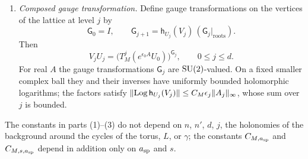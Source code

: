 \begin{lemma}
\begin{enumerate}
\[\]
The coordinate $(A_j)_c$ depends only on the variables $A_e$ with $\dist(c,e)\le C_M\epsilon_j$, where distances are measured in the units above, in which the coarse spacing is one. For every fixed $\asp\ge0$ we have $\norm{D_AA_j}_{\asp,\mathrm{row}}\le C_{M,\asp}$ on the same ball. For every fixed $s\ge1$, on the ball $\norm A_\infty<a_*/2$, every coarse link $c$ and all link fields $B_1,\ldots,B_s$,
\[
 \bigl\lvert\bigl(D_A^sA_j(A)[B_1,\ldots,B_s]\bigr)_c\bigr\rvert\le C_{M,s,\asp}\prod_{\ell=1}^s\sup_ee^{-\asp\dist(c,e)}\abs{(B_\ell)_e}.
\]
\item \emph{Composed gauge transformation.} Define gauge transformations on the vertices of the lattice at level $j$ by
\[
 \mathsf G_0=I,\qquad\mathsf G_{j+1}=\mathsf h_{U_j}(V_j)\,(\mathsf G_j|_{\mathrm{roots}}).
\]
Then
\[
 V_jU_j=\bigl(T_M^j(e^{\epsilon_0A}U_0)\bigr)^{\mathsf G_j},\qquad0\le j\le d.
\]
For real $A$ the gauge transformations $\mathsf G_j$ are $\mathrm{SU}(2)$-valued. On a fixed smaller complex ball they and their inverses have uniformly bounded holomorphic logarithms; the factors satisfy $\lVert \operatorname{Log}\mathsf h_{U_j}(V_j)\rVert\le C_M\epsilon_j\lVert A_j\rVert_\infty$, whose sum over $j$ is bounded.
\end{enumerate}
The constants in parts (1)--(3) do not depend on $n$, $n'$, $d$, $j$, the holonomies of the background around the cycles of the torus, $L$, or $\gamma$; the constants $C_{M,a_{\mathrm{sp}}}$ and $C_{M,s,a_{\mathrm{sp}}}$ depend in addition only on $a_{\mathrm{sp}}$ and $s$.
\end{lemma}

